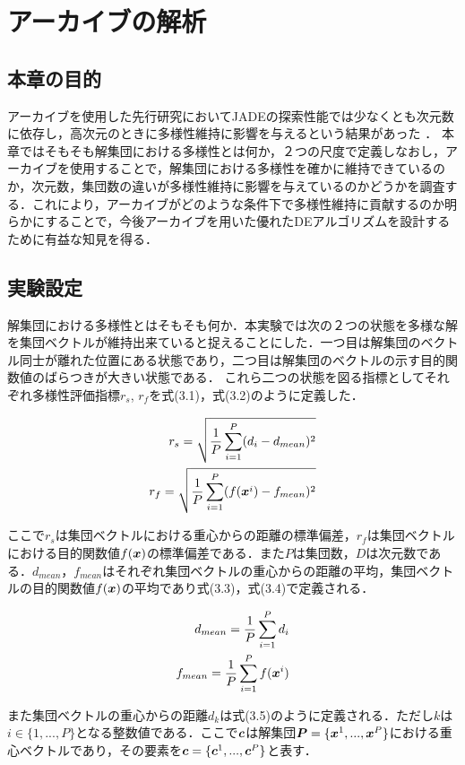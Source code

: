 \documentclass[a4paper,11pt,oneside,openany]{jsbook}
\def\vector#1{\mbox{\boldmath $#1$}}
\begin{document}
\chapter{アーカイブの解析}
\section{本章の目的}
アーカイブを使用した先行研究においてJADEの探索性能では少なくとも次元数に依存し，高次元のときに多様性維持に影響を与えるという結果があった \cite{JADE} ．
本章ではそもそも解集団における多様性とは何か，２つの尺度で定義しなおし，アーカイブを使用することで，解集団における多様性を確かに維持できているのか，次元数，集団数の違いが多様性維持に影響を与えているのかどうかを調査する．これにより，アーカイブがどのような条件下で多様性維持に貢献するのか明らかにすることで，今後アーカイブを用いた優れたDEアルゴリズムを設計するために有益な知見を得る．

\section{実験設定}
解集団における多様性とはそもそも何か．本実験では次の２つの状態を多様な解を集団ベクトルが維持出来ていると捉えることにした．一つ目は解集団のベクトル同士が離れた位置にある状態であり，二つ目は解集団のベクトルの示す目的関数値のばらつきが大きい状態である．
これら二つの状態を図る指標としてそれぞれ多様性評価指標$r_s$, $r_f$を式(3.1)，式(3.2)のように定義した．

\begin{eqnarray}
r_{s} = \sqrt{\frac{1}{P}\sum_{i=1}^{P} (d_i - d_{mean})^2} \\
r_{f} = \sqrt{\frac{1}{P}\sum_{i=1}^{P} (f(\vector{x}^i) - f_{mean})^2}
\end{eqnarray}

ここで$r_s$は集団ベクトルにおける重心からの距離の標準偏差，$r_f$は集団ベクトルにおける目的関数値$f(\vector{x})$の標準偏差である．また$P$は集団数，$D$は次元数である．$d_{mean}$，$f_{mean}$はそれぞれ集団ベクトルの重心からの距離の平均，集団ベクトルの目的関数値$f(\vector{x})$の平均であり式(3.3)，式(3.4)で定義される．

\begin{eqnarray}
d_{mean} = \frac{1}{P}\sum_{i=1}^{P}d_i \\
f_{mean} = \frac{1}{P}\sum_{i=1}^{P}f(\vector{x}^i)
\end{eqnarray}

また集団ベクトルの重心からの距離$d_k$は式(3.5)のように定義される．ただし$k$は$i \in \{1, ..., P\}$となる整数値である．ここで$\vector{c}$は解集団$\vector{P} = \{ \vector{x}^{1}, ..., \vector{x}^{P} \}$における重心ベクトルであり，その要素を$\vector{c} = \{ \vector{c}^{1}, ..., \vector{c}^{P} \}$と表す．
\end{document}
